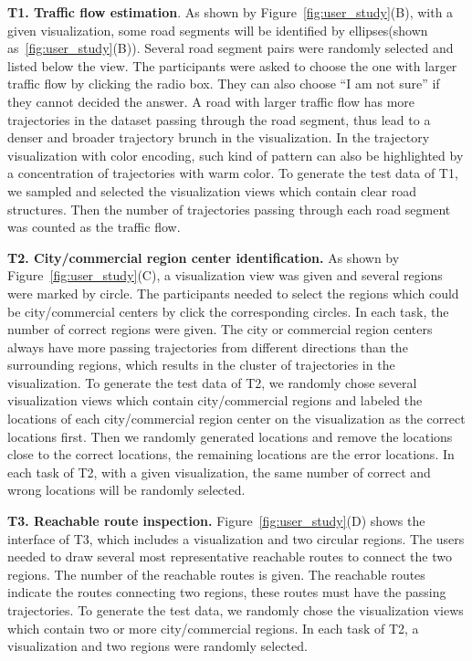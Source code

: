 \textbf{T1. Traffic flow estimation}. 
As shown by Figure~\ref{fig:user_study}(B), with a given visualization, some road segments will be identified by ellipses(shown as~\ref{fig:user_study}(B)). Several road segment pairs were randomly selected and listed below the view. The participants were asked to choose the one with larger traffic flow by clicking the radio box. They can also choose ``I am not sure'' if they cannot decided the answer. 
A road with larger traffic flow has more trajectories in the dataset passing through the road segment, thus lead to a denser and broader trajectory brunch in the visualization. In the trajectory visualization with color encoding, such kind of pattern can also be highlighted by a concentration of trajectories with warm color. 
To generate the test data of T1,  we sampled and selected the visualization views which contain clear road structures. Then the number of trajectories passing through each road segment was counted as the traffic flow. 

\textbf{T2. City/commercial region center identification.} 
As shown by Figure~\ref{fig:user_study}(C), a visualization view was given and several regions were marked by circle. The participants needed to select the regions which could be city/commercial centers by click the corresponding circles. In each task, the number of correct regions were given. 
The city or commercial region centers always have more passing trajectories from different directions than the surrounding regions, which results in the  cluster of trajectories in the visualization. 
To generate the test data of T2, we randomly chose several visualization views which contain city/commercial regions and labeled the locations of each city/commercial region center on the visualization as the correct locations first.  Then we randomly generated locations and remove the locations close to the correct locations, the remaining locations are the error locations. In each task of T2, with a given visualization, the same number of correct and wrong locations will be randomly selected. 

\textbf{T3. Reachable route inspection.} 
Figure~\ref{fig:user_study}(D) shows the interface of T3, which includes a visualization and two circular regions. The users needed to draw several most representative reachable routes to connect the two regions. The number of the reachable routes is given. 
The reachable routes indicate the routes connecting two regions, these routes must have the passing trajectories. 
To generate the test data, we randomly chose the visualization views which contain two or more city/commercial regions. In each task of T2, a visualization and two regions were randomly selected.


